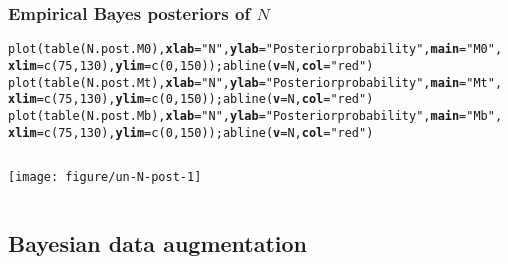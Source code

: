 \documentclass[color=usenames,dvipsnames]{beamer}\usepackage[]{graphicx}\usepackage[]{color}
\makeatletter
\newcommand{\hlnum}[1]{\textcolor[rgb]{0.69,0.494,0}{#1}}%
\newcommand{\hlstr}[1]{\textcolor[rgb]{0.749,0.012,0.012}{#1}}%
\newcommand{\hlstd}[1]{\textcolor[rgb]{0,0,0}{#1}}%
\newcommand{\hlkwc}[1]{\textcolor[rgb]{0,0,0}{\textbf{#1}}}%
\newcommand{\hlkwd}[1]{\textcolor[rgb]{0.004,0.004,0.506}{#1}}%
\newenvironment{kframe}{%
 \def\at@end@of@kframe{}%
 \ifinner\ifhmode%
  \def\at@end@of@kframe{\end{minipage}}%
  \begin{minipage}{\columnwidth}%
 \fi\fi%
 \def\FrameCommand##1{\hskip\@totalleftmargin \hskip-\fboxsep
 \colorbox{shadecolor}{##1}\hskip-\fboxsep
     \hskip-\linewidth \hskip-\@totalleftmargin \hskip\columnwidth}%
 \MakeFramed {\advance\hsize-\width
   \@totalleftmargin\z@ \linewidth\hsize
   \@setminipage}}%
 {\par\unskip\endMakeFramed%
 \at@end@of@kframe}
\newenvironment{knitrout}{}{} %
\makeatother
\begin{document}
\begin{frame}[fragile]
  \frametitle{Empirical Bayes posteriors of $N$}
\begin{knitrout}\tiny
{}\color{fgcolor}\begin{kframe}
\begin{alltt}
\hlkwd{plot}\hlstd{(}\hlkwd{table}\hlstd{(N.post.M0),} \hlkwc{xlab}\hlstd{=}\hlstr{"N"}\hlstd{,} \hlkwc{ylab}\hlstd{=}\hlstr{"Posterior probability"}\hlstd{,} \hlkwc{main}\hlstd{=}\hlstr{"M0"}\hlstd{,}
     \hlkwc{xlim}\hlstd{=}\hlkwd{c}\hlstd{(}\hlnum{75}\hlstd{,} \hlnum{130}\hlstd{),} \hlkwc{ylim}\hlstd{=}\hlkwd{c}\hlstd{(}\hlnum{0}\hlstd{,}\hlnum{150}\hlstd{));} \hlkwd{abline}\hlstd{(}\hlkwc{v}\hlstd{=N,} \hlkwc{col}\hlstd{=}\hlstr{"red"}\hlstd{)}
\hlkwd{plot}\hlstd{(}\hlkwd{table}\hlstd{(N.post.Mt),} \hlkwc{xlab}\hlstd{=}\hlstr{"N"}\hlstd{,} \hlkwc{ylab}\hlstd{=}\hlstr{"Posterior probability"}\hlstd{,} \hlkwc{main}\hlstd{=}\hlstr{"Mt"}\hlstd{,}
     \hlkwc{xlim}\hlstd{=}\hlkwd{c}\hlstd{(}\hlnum{75}\hlstd{,} \hlnum{130}\hlstd{),} \hlkwc{ylim}\hlstd{=}\hlkwd{c}\hlstd{(}\hlnum{0}\hlstd{,}\hlnum{150}\hlstd{));} \hlkwd{abline}\hlstd{(}\hlkwc{v}\hlstd{=N,} \hlkwc{col}\hlstd{=}\hlstr{"red"}\hlstd{)}
\hlkwd{plot}\hlstd{(}\hlkwd{table}\hlstd{(N.post.Mb),} \hlkwc{xlab}\hlstd{=}\hlstr{"N"}\hlstd{,} \hlkwc{ylab}\hlstd{=}\hlstr{"Posterior probability"}\hlstd{,} \hlkwc{main}\hlstd{=}\hlstr{"Mb"}\hlstd{,}
     \hlkwc{xlim}\hlstd{=}\hlkwd{c}\hlstd{(}\hlnum{75}\hlstd{,} \hlnum{130}\hlstd{),} \hlkwc{ylim}\hlstd{=}\hlkwd{c}\hlstd{(}\hlnum{0}\hlstd{,}\hlnum{150}\hlstd{));} \hlkwd{abline}\hlstd{(}\hlkwc{v}\hlstd{=N,} \hlkwc{col}\hlstd{=}\hlstr{"red"}\hlstd{)}
\end{alltt}
\end{kframe}
\end{knitrout}
  \begin{columns}
    \begin{column}{0.95\paperwidth}
      \texttt{[image: figure/un-N-post-1]}
    \end{column}
  \end{columns}
\end{frame}





\subsection{Bayesian data augmentation}

\end{document}
